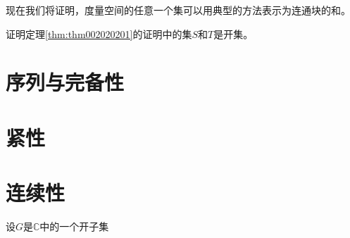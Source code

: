 现在我们将证明，度量空间的任意一个集可以用典型的方法表示为连通块的和。


\begin{exercise}\label{exer002020202}
证明定理\ref{thm:thm002020201}的证明中的集$S$和$T$是开集。
\end{exercise}


\section{序列与完备性}\label{section0020203}

\section{紧性}\label{section0020204}

\section{连续性}\label{section0020205}

\begin{exercise}\label{exer002020507}
设$G$是$\mathbb{C}$中的一个开子集
\end{exercise}





